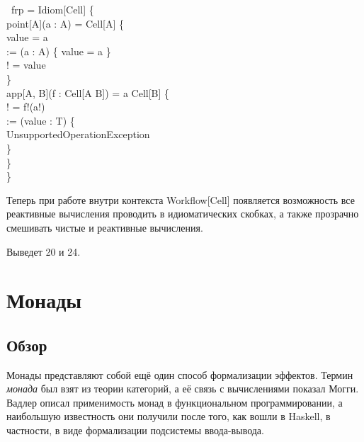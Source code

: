 \begin{haskell}
 ~frp =  Idiom[Cell] \{\\
\quad{} point[A](a : A) =  Cell[A] \{\\
\quad\quad{}  value = a\\
\quad\quad{} := (a : A) \{ value = a \}\\
\quad\quad{} ! = value\\
\quad\}\\
\quad{} app[A, B](f : Cell[A \Rightarrow B]) = a \Rightarrow {} Cell[B] \{\\
\quad\quad{} ! = f!(a!)\\
\quad\quad{} := (value : T) \{ \\
\quad\quad\quad{}  UnsupportedOperationException\\
\quad\quad\}\\
\quad\}\\
\}
\end{haskell}

Теперь при работе внутри контекста \<Workflow[Cell]\> появляется возможность все реактивные вычисления проводить в идиоматических скобках, а также прозрачно смешивать чистые и реактивные вычисления.

\begin{haskell}
\end{haskell}

Выведет 20 и 24.

\chapter{Монады}
\section{Обзор}
Монады представляют собой ещё один способ формализации эффектов. Термин \emph{монада} был взят из теории категорий, а её связь с вычислениями показал Могги\cite{Moggi1991}. Вадлер описал\cite{Wadler1992,wadler1993monads} применимость монад в функциональном программировании, а наибольшую известность они получили после того, как вошли в Haskell, в частности, в виде формализации подсистемы ввода-вывода\cite{Jones1993}.

